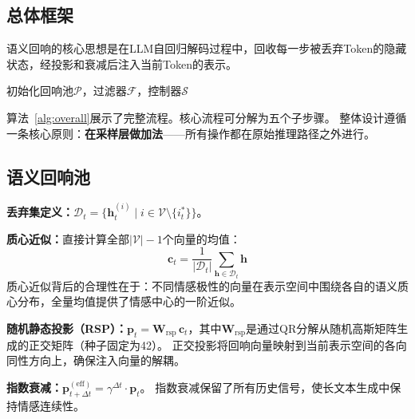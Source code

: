 \documentclass[a4paper, 11pt]{article}
\begin{document}
\subsection{总体框架}

语义回响的核心思想是在LLM自回归解码过程中，回收每一步被丢弃Token的隐藏状态，经投影和衰减后注入当前Token的表示。

\begin{algorithm}[ht]
  \caption{语义回响整体流程}\label{alg:overall}\footnotesize
  初始化回响池$\mathcal{P}$，过滤器$\mathcal{F}$，控制器$\mathcal{S}$\;
\end{algorithm}

算法~\ref{alg:overall}展示了完整流程。核心流程可分解为五个子步骤。
整体设计遵循一条核心原则：\textbf{在采样层做加法}——所有操作都在原始推理路径之外进行。

\subsection{语义回响池}

\textbf{丢弃集定义：}$\mathcal{D}_t=\{\bm{h}_t^{(i)}\mid i\in\mathcal{V}\setminus\{i_t^*\}\}$。

\textbf{质心近似：}直接计算全部$|\mathcal{V}|-1$个向量的均值：
\begin{equation}
  \bm{c}_t=\frac{1}{|\mathcal{D}_t|}\sum_{\bm{h}\in\mathcal{D}_t}\bm{h}
\end{equation}
质心近似背后的合理性在于：不同情感极性的向量在表示空间中围绕各自的语义质心分布，全量均值提供了情感中心的一阶近似。

\textbf{随机静态投影（RSP）：}$\bm{p}_t=\bm{W}_{\text{rsp}}\,\bm{c}_t$，其中$\bm{W}_{\text{rsp}}$是通过QR分解从随机高斯矩阵生成的正交矩阵（种子固定为42）。
正交投影将回响向量映射到当前表示空间的各向同性方向上，确保注入向量的解耦。

\textbf{指数衰减：}$\bm{p}_{t+\Delta t}^{(\text{eff})}=\gamma^{\Delta t}\cdot\bm{p}_t$。
指数衰减保留了所有历史信号，使长文本生成中保持情感连续性。
\end{document}
